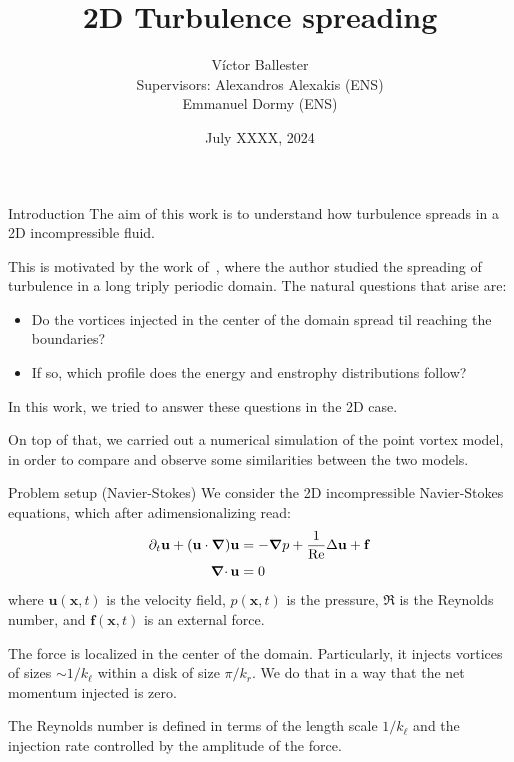 \documentclass{beamer} %
\title{2D Turbulence spreading}
\author{
	Víctor Ballester\texorpdfstring{\vspace{0.45cm}\\}{}{\small Supervisors: Alexandros Alexakis (ENS)\texorpdfstring{\\}{}
\hspace{1.5cm} Emmanuel Dormy (ENS)}}
\date{July XXXX, 2024}
\begin{document}
\thispagestyle{empty}
\frame[noframenumbering]{\titlepage}
\setcounter{framenumber}{0}
\begin{frame}{Introduction}
	The aim of this work is to understand how turbulence spreads in a 2D incompressible fluid.

	This is motivated by the work of~\cite{alexakis}, where the author studied the spreading of turbulence in a long triply periodic domain. The natural questions that arise are:
	\begin{itemize}
		\item Do the vortices injected in the center of the domain spread til reaching the boundaries?
		\item If so, which profile does the energy and enstrophy distributions follow?
	\end{itemize}

	In this work, we tried to answer these questions in the 2D case.

	On top of that, we carried out a numerical simulation of the \textcolor{\mycolorhighlight}{point vortex model}, in order to compare and observe some similarities between the two models.
\end{frame}
\begin{frame}{Problem setup (Navier-Stokes)}
	We consider the \textcolor{\mycolorhighlight}{2D incompressible Navier-Stokes equations}, which after adimensionalizing read:
	\begin{align*}
		\partial_t \mathbf{u} + (\mathbf{u} \cdot \grad) \mathbf{u} & = -\grad p + \frac{1}{\text{Re}} \Delta \mathbf{u} + \mathbf{f} \\
		\operatorname{\boldsymbol{\nabla}\cdot} \mathbf{u}                                            & = 0
	\end{align*}
	where $\mathbf{u}(\mathbf{x},t)$ is the velocity field, $p(\mathbf{x},t)$ is the pressure, $\Re$ is the Reynolds number, and $\mathbf{f}(\mathbf{x},t)$ is an external force.

	The force is localized in the center of the domain. Particularly, it injects vortices of sizes $\sim 1/k_\ell$ within a disk of size $\pi/k_r$. We do that in a way that the net momentum injected is zero.

	The Reynolds number is defined in terms of the length scale $1/k_\ell$ and the injection rate controlled by the amplitude of the force.
\end{frame}
\end{document}
